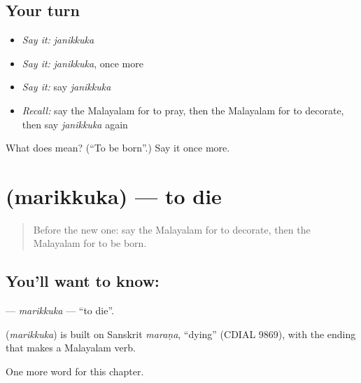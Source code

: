 \subsection*{Your turn}
\begin{itemize}
\raggedright
  \item \emph{Say it:} \emph{janikkuka}
  \item \emph{Say it:} \emph{janikkuka}, once more
  \item \emph{Say it:} say \emph{janikkuka}
  \item \emph{Recall:} say the Malayalam for to pray, then the Malayalam for to decorate, then say \emph{janikkuka} again
\end{itemize}

\begin{tcolorbox}[breakable,colback=teal!4,colframe=teal!35!black,title={Before you move on}]
What does  mean? (\textquotedblleft{}To be born\textquotedblright{}.) Say it once more.
\end{tcolorbox}
\section[\texorpdfstring{\ml{മരിക്കുക} (marikkuka)}{മരിക്കുക (marikkuka)}]{ (marikkuka) — to die}

\label{lesson:ML-C269-marikkuka}



\begin{quote}
Before the new one: say the Malayalam for to decorate, then the Malayalam for to be born.
\end{quote}

\subsection*{You'll want to know: }
\textbf{} — \emph{marikkuka} — \textquotedblleft{}to die\textquotedblright{}.

\begin{cousinweb}
\textbf{} (\emph{marikkuka}) is built on Sanskrit \emph{maraṇa}, \textquotedblleft{}dying\textquotedblright{} (CDIAL 9869), with the ending that makes a Malayalam verb.
\end{cousinweb}

\begin{grammarlens}[title={What you've built}]
One more word for this chapter.
\end{grammarlens}

